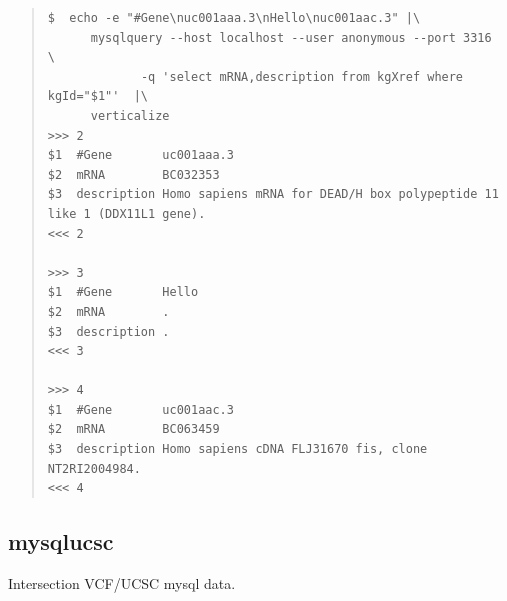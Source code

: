 \documentclass[12pt]{article}
\begin{document}
\begin{quote}
\begin{verbatim}
$  echo -e "#Gene\nuc001aaa.3\nHello\nuc001aac.3" |\
      mysqlquery --host localhost --user anonymous --port 3316  \
             -q 'select mRNA,description from kgXref where kgId="$1"'  |\
      verticalize 
>>>	2
$1	#Gene      	uc001aaa.3
$2	mRNA       	BC032353
$3	description	Homo sapiens mRNA for DEAD/H box polypeptide 11 like 1 (DDX11L1 gene).
<<<	2

>>>	3
$1	#Gene      	Hello
$2	mRNA       	.
$3	description	.
<<<	3

>>>	4
$1	#Gene      	uc001aac.3
$2	mRNA       	BC063459
$3	description	Homo sapiens cDNA FLJ31670 fis, clone NT2RI2004984.
<<<	4
\end{verbatim}
\end{quote}

\subsection{mysqlucsc}
Intersection VCF/UCSC mysql data.
\end{document}

